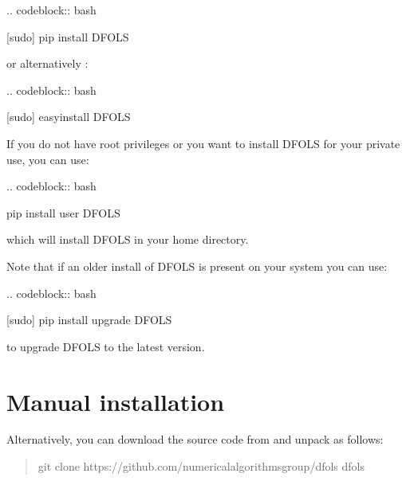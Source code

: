 \documentclass[letterpaper,10pt,english]{sphinxmanual}
\begin{document}
\begin{sphinxVerbatim}[commandchars=\\\{\}]
.. code\PYGZhy{}block:: bash

   \PYGZdl{} [sudo] pip install DFO\PYGZhy{}LS
\end{sphinxVerbatim}

or alternatively :

\begin{sphinxVerbatim}[commandchars=\\\{\}]
.. code\PYGZhy{}block:: bash

   \PYGZdl{} [sudo] easy\PYGZus{}install DFO\PYGZhy{}LS
\end{sphinxVerbatim}

If you do not have root privileges or you want to install DFO\sphinxhyphen{}LS for your private use, you can use:

\begin{sphinxVerbatim}[commandchars=\\\{\}]
.. code\PYGZhy{}block:: bash

   \PYGZdl{} pip install \PYGZhy{}\PYGZhy{}user DFO\PYGZhy{}LS
\end{sphinxVerbatim}

which will install DFO\sphinxhyphen{}LS in your home directory.

Note that if an older install of DFO\sphinxhyphen{}LS is present on your system you can use:

\begin{sphinxVerbatim}[commandchars=\\\{\}]
.. code\PYGZhy{}block:: bash

   \PYGZdl{} [sudo] pip install \PYGZhy{}\PYGZhy{}upgrade DFO\PYGZhy{}LS
\end{sphinxVerbatim}

to upgrade DFO\sphinxhyphen{}LS to the latest version.


\section{Manual installation}
\label{\detokenize{install:manual-installation}}
Alternatively, you can download the source code from  and unpack as follows:
\begin{quote}

\begin{sphinxVerbatim}[commandchars=\\\{\}]
\PYGZdl{} git clone https://github.com/numericalalgorithmsgroup/dfols
\PYGZdl{}  dfols
\end{sphinxVerbatim}
\end{quote}
\end{document}
